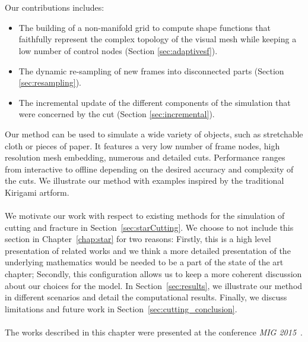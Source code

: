 \\ \\
Our contributions includes:
\begin{itemize}
\item The building of a non-manifold grid to compute shape functions that faithfully represent the complex topology of the visual mesh while keeping a low number of control nodes (Section \ref{sec:adaptivesf}).
\item The dynamic re-sampling of new frames into disconnected parts (Section \ref{sec:resampling}).
\item The incremental update of the different components of the simulation that were concerned by the cut (Section \ref{sec:incremental}).
\end{itemize}
Our method can be used to simulate a wide variety of objects, such as stretchable cloth or pieces of paper. 
It features a very low number of frame nodes, high resolution mesh embedding, numerous and detailed cuts. 
Performance ranges from interactive to offline depending on the desired accuracy and complexity of the cuts.
We illustrate our method with examples inspired by the traditional Kirigami artform.
\\ \\
We motivate our work with respect to existing methods for the simulation of cutting and fracture in Section~\ref{sec:starCutting}.
We choose to not include this section in Chapter~\ref{chap:star} for two reasons:
Firstly, this is a high level presentation of related works and we think a more detailed presentation of the underlying mathematics would be needed to be a part of the state of the art chapter;
Secondly, this configuration allows us to keep a more coherent discussion about our choices for the model.
In Section~\ref{sec:results}, we illustrate our method in different scenarios and detail the computational results. 
Finally, we discuss limitations and future work in Section~\ref{sec:cutting_conclusion}.
\\ \\
The works described in this chapter were presented at the conference \emph{MIG 2015}~\cite{Manteaux2015}.
